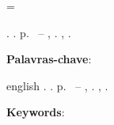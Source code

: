 \documentclass[
	12pt,				%
	openright,			%
	twoside,			%
	a4paper,			%
	english,			%
	french,				%
	spanish,			%
	brazil,				%
	hyphens
	]{abntex2}
\begin{document}
\verificaTitulo


\raggedbottom

\emergencystretch=\maxdimen
{}
\sloppy

\frenchspacing 


\imprimircapa

\imprimirfolhaderosto

	{	
		\begin{agradecimentos}
			
		\end{agradecimentos}
	}
	{}%

	{	
		\begin{epigrafe}
			\vspace*{\fill}	
			\begin{flushright}
				
			\end{flushright}
		\end{epigrafe}
	}
	{}%



\setlength{\absparsep}{18pt} %
\begin{resumo}
	\NomeCitacao. \MakeUppercase{\TituloCorpo}.  \pageref{LastPage} p. \TipoTrabalho\ – \Programa, \Universidade. \Local, \the\year.
	
	
	
	\textbf{Palavras-chave}: \PalavrasChave
\end{resumo}

\begin{resumo}[Abstract]
	\begin{otherlanguage*}{english}
		\NomeCitacao. \MakeUppercase{\TituloEN}.  \pageref{LastPage} p. \TipoTrabalhoEN\ – \ProgramaEN, \UniversidadeEN. \Local, \the\year.
		
		
		
		\textbf{Keywords}: \PalavrasChaveEN
	\end{otherlanguage*}
\end{resumo}
\end{document}
